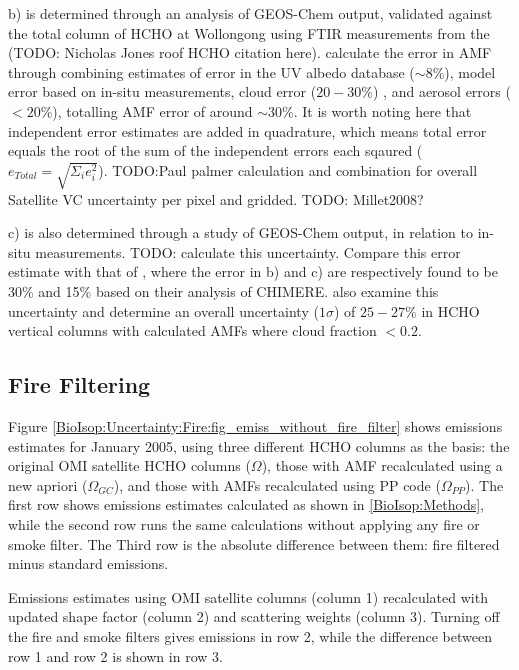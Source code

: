     b) is determined through an analysis of GEOS-Chem output, validated against the total column of HCHO at Wollongong using FTIR measurements from the (TODO: Nicholas Jones roof HCHO citation here).
    \textcite{Palmer2006} calculate the error in AMF through combining estimates of error in the UV albedo database ($\sim 8$\%), model error based on in-situ measurements, cloud error  ($20-30$\%) \parencite{Martin2003}, and aerosol errors ($<20$\%), totalling AMF error of around $\sim 30$\%.
    It is worth noting here that independent error estimates are added in quadrature, which means total error equals the root of the sum of the independent errors each sqaured ($e_{Total}=\sqrt{\Sigma_i e_i^2}$).
    TODO:Paul palmer calculation and combination for overall Satellite VC uncertainty per pixel and gridded.
    TODO: Millet2008?
    
    c) is also determined through a study of GEOS-Chem output, in relation to in-situ measurements.
    TODO: calculate this uncertainty.
    Compare this error estimate with that of \textcite{Curci2010}, where the error in b) and c) are respectively found to be 30\% and 15\% based on their analysis of CHIMERE.
    \textcite{Millet2008} also examine this uncertainty and determine an overall uncertainty ($1\sigma$) of $25-27\%$ in HCHO vertical columns with calculated AMFs where cloud fraction $< 0.2$.
    
  \subsection{Fire Filtering}
    
    Figure \ref{BioIsop:Uncertainty:Fire:fig_emiss_without_fire_filter} shows emissions estimates for January 2005, using three different HCHO columns as the basis: the original OMI satellite HCHO columns ($\Omega$), those with AMF recalculated using a new apriori ($\Omega_{GC}$), and those with AMFs recalculated using PP code ($\Omega_{PP}$).
    The first row shows emissions estimates calculated as shown in \ref{BioIsop:Methods}, while the second row runs the same calculations without applying any fire or smoke filter.
    The Third row is the absolute difference between them: fire filtered minus standard emissions.
    
    {Emissions estimates using OMI satellite columns (column 1) recalculated with updated shape factor (column 2) and scattering weights (column 3). Turning off the fire and smoke filters gives emissions in row 2, while the difference between row 1 and row 2 is shown in row 3.}
    {\label{BioIsop:Uncertainty:Fire:fig_emiss_without_fire_filter}}
    
